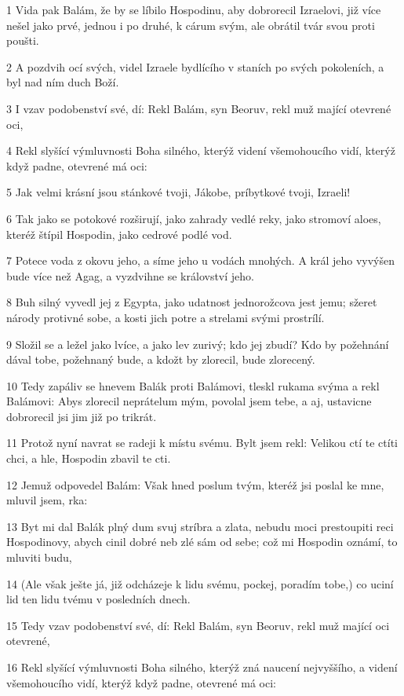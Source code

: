 \par 1 Vida pak Balám, že by se líbilo Hospodinu, aby dobrorecil Izraelovi, již více nešel jako prvé, jednou i po druhé, k cárum svým, ale obrátil tvár svou proti poušti.
\par 2 A pozdvih ocí svých, videl Izraele bydlícího v staních po svých pokoleních, a byl nad ním duch Boží.
\par 3 I vzav podobenství své, dí: Rekl Balám, syn Beoruv, rekl muž mající otevrené oci,
\par 4 Rekl slyšící výmluvnosti Boha silného, kterýž videní všemohoucího vidí, kterýž když padne, otevrené má oci:
\par 5 Jak velmi krásní jsou stánkové tvoji, Jákobe, príbytkové tvoji, Izraeli!
\par 6 Tak jako se potokové rozširují, jako zahrady vedlé reky, jako stromoví aloes, kteréž štípil Hospodin, jako cedrové podlé vod.
\par 7 Potece voda z okovu jeho, a síme jeho u vodách mnohých. A král jeho vyvýšen bude více než Agag, a vyzdvihne se království jeho.
\par 8 Buh silný vyvedl jej z Egypta, jako udatnost jednorožcova jest jemu; sžeret národy protivné sobe, a kosti jich potre a strelami svými prostrílí.
\par 9 Složil se a ležel jako lvíce, a jako lev zurivý; kdo jej zbudí? Kdo by požehnání dával tobe, požehnaný bude, a kdožt by zlorecil, bude zlorecený.
\par 10 Tedy zapáliv se hnevem Balák proti Balámovi, tleskl rukama svýma a rekl Balámovi: Abys zlorecil neprátelum mým, povolal jsem tebe, a aj, ustavicne dobrorecil jsi jim již po trikrát.
\par 11 Protož nyní navrat se radeji k místu svému. Bylt jsem rekl: Velikou ctí te ctíti chci, a hle, Hospodin zbavil te cti.
\par 12 Jemuž odpovedel Balám: Však hned poslum tvým, kteréž jsi poslal ke mne, mluvil jsem, rka:
\par 13 Byt mi dal Balák plný dum svuj stríbra a zlata, nebudu moci prestoupiti reci Hospodinovy, abych cinil dobré neb zlé sám od sebe; což mi Hospodin oznámí, to mluviti budu,
\par 14 (Ale však ješte já, již odcházeje k lidu svému, pockej, poradím tobe,) co uciní lid ten lidu tvému v posledních dnech.
\par 15 Tedy vzav podobenství své, dí: Rekl Balám, syn Beoruv, rekl muž mající oci otevrené,
\par 16 Rekl slyšící výmluvnosti Boha silného, kterýž zná naucení nejvyššího, a videní všemohoucího vidí, kterýž když padne, otevrené má oci:
